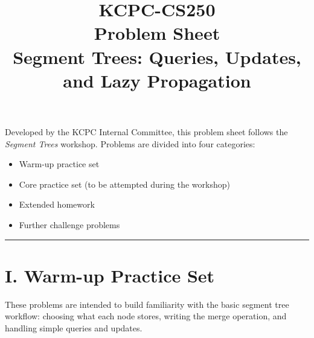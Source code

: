 \documentclass[11pt]{article}
\title{KCPC-CS250 \\ Problem Sheet \\ Segment Trees: Queries, Updates, and Lazy Propagation}
\author{}
\date{}
\begin{document}
\maketitle

\noindent
Developed by the KCPC Internal Committee, this problem sheet follows the
\textit{Segment Trees} workshop.
Problems are divided into four categories:
\begin{itemize}
    \item Warm-up practice set
    \item Core practice set (to be attempted during the workshop)
    \item Extended homework
    \item Further challenge problems
\end{itemize}

\hrule
\vspace{1em}

\section*{I. Warm-up Practice Set}

These problems are intended to build familiarity with the basic segment tree
workflow: choosing what each node stores, writing the merge operation, and
handling simple queries and updates.
\end{document}
